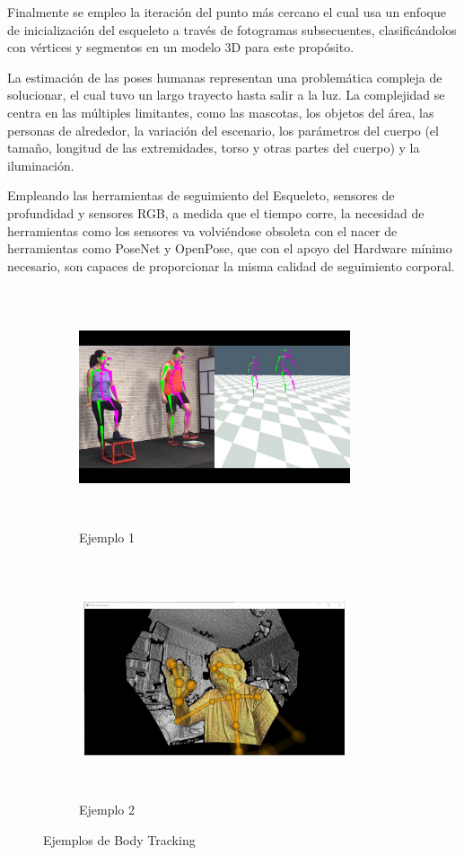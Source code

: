 Finalmente se empleo la iteración del punto más cercano \cite{grest2005nonlinear} el cual usa un enfoque de inicialización del esqueleto a través de fotogramas subsecuentes, clasificándolos con vértices y segmentos en un modelo 3D para este propósito.

La estimación de las poses humanas representan una problemática compleja de solucionar, el cual tuvo un largo trayecto hasta salir a la luz. La complejidad se centra en las múltiples limitantes, como las mascotas, los objetos del área, las personas de alrededor, la variación del escenario, los parámetros del cuerpo (el tamaño, longitud de las extremidades, torso y otras partes del cuerpo) y la iluminación.

Empleando las herramientas de seguimiento del Esqueleto, sensores de profundidad y sensores RGB, a medida que el tiempo corre, la necesidad de herramientas como los sensores va volviéndose obsoleta con el nacer de herramientas como PoseNet y OpenPose, que con el apoyo del Hardware mínimo necesario, son capaces de proporcionar la misma calidad de seguimiento corporal.

\begin{figure}
	\centering
	\begin{subfigure}{.5\textwidth}
		\centering
		\includegraphics[width=8cm,height=7cm,]{./Images/examplebodytracking.jpg}
		\caption{Ejemplo 1}
		\label{bodyexa1}
	\end{subfigure}%
	\begin{subfigure}{0.5\textwidth}
		\centering
		\includegraphics[width=8cm,height=7cm,]{./Images/examplekinect.jpg}
		\caption{Ejemplo 2}
		\label{bodyexa2}
	\end{subfigure}
	\caption{Ejemplos de Body Tracking}
	\label{bodyexafigure}
\end{figure}
